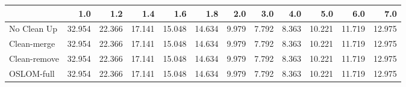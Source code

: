 \begin{tabular}{lrrrrrrrrrrr}
\toprule
{} &    1.0 &    1.2 &    1.4 &    1.6 &    1.8 &   2.0 &   3.0 &   4.0 &    5.0 &    6.0 &    7.0 \\
\midrule
No Clean Up  & 32.954 & 22.366 & 17.141 & 15.048 & 14.634 & 9.979 & 7.792 & 8.363 & 10.221 & 11.719 & 12.975 \\
Clean-merge  & 32.954 & 22.366 & 17.141 & 15.048 & 14.634 & 9.979 & 7.792 & 8.363 & 10.221 & 11.719 & 12.975 \\
Clean-remove & 32.954 & 22.366 & 17.141 & 15.048 & 14.634 & 9.979 & 7.792 & 8.363 & 10.221 & 11.719 & 12.975 \\
OSLOM-full   & 32.954 & 22.366 & 17.141 & 15.048 & 14.634 & 9.979 & 7.792 & 8.363 & 10.221 & 11.719 & 12.975 \\
\bottomrule
\end{tabular}
